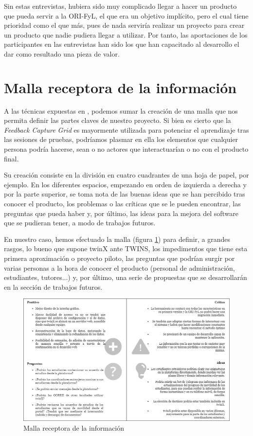 Sin estas entrevistas, hubiera sido muy complicado llegar a hacer un producto que pueda servir a la ORI-FyL, el que era un objetivo implícito, pero el cual tiene prioridad como el que más, pues de nada serviría realizar un proyecto para crear un producto que nadie pudiera llegar a utilizar. Por tanto, las aportaciones de los participantes en las entrevistas han sido los que han capacitado al desarrollo el dar como resultado una pieza de valor.

\section{Malla receptora de la información}

A las técnicas expuestas en , podemos sumar la creación de una malla que nos permita definir las partes claves de nuestro proyecto. Si bien es cierto que la \textit{Feedback Capture Grid} es mayormente utilizada para potenciar el aprendizaje tras las sesiones de pruebas, podríamos plasmar en ella los elementos que cualquier persona podría hacerse, sean o no actores que interactuarían o no con el producto final. \cite{feedbackCaptureGrid}

Su creación consiste en la división en cuatro cuadrantes de una hoja de papel, por ejemplo. En los diferentes espacios, empezando en orden de izquierda a derecha y por la parte superior, se toma nota de las buenas ideas que se han percibido tras conocer el producto, los problemas o las críticas que se le pueden encontrar, las preguntas que pueda haber y, por último, las ideas para la mejora del software que se pudieran tener, a modo de trabajos futuros.

En nuestro caso, hemos efectuado la malla (figura \ref{fig:malla}) para definir, a grandes rasgos, lo bueno que supone twinX ante TWINS, los impedimentos que tiene esta primera aproximación o proyecto piloto, las preguntas que podrían surgir por varias personas a la hora de conocer el producto (personal de administración, estudiantes, tutores...) y, por último, una serie de propuestas que se desarrollarán en la sección de trabajos futuros.


\begin{figure}
	\centering
	\includegraphics[width=\textwidth]{img/malla.png}
	\caption{Malla receptora de la información}
	\label{fig:malla}
\end{figure}


